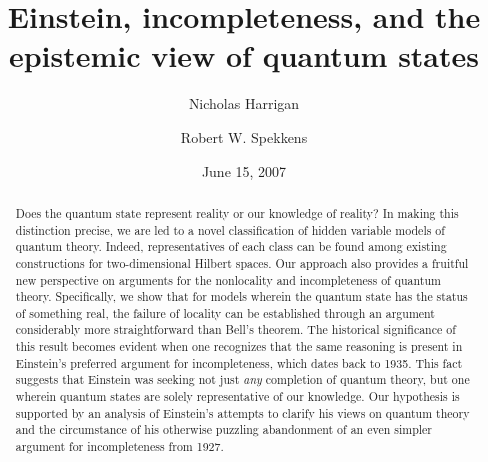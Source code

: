 \documentclass[aps,nofootinbib,12pt]{revtex4}
\begin{document}
\title{Einstein, incompleteness, and the epistemic view of quantum states}
\author{Nicholas Harrigan}
\author{Robert W. Spekkens}
\date{June 15, 2007}




\begin{abstract}
Does the quantum state represent reality or our knowledge of
reality? In making this distinction precise, we are led to a novel
classification of hidden variable models of quantum theory. Indeed,
representatives of each class can be found among existing
constructions for two-dimensional Hilbert spaces. Our approach also
provides a fruitful new perspective on arguments for the nonlocality
and incompleteness of quantum theory. Specifically, we show that for
models wherein the quantum state has the status of something real,
the failure of locality can be established through an argument
considerably more straightforward than Bell's theorem. The
historical significance of this result becomes evident when one
recognizes that the same reasoning is present in Einstein's
preferred argument for incompleteness, which dates back to 1935.
This fact suggests that Einstein was seeking not just \textit{any}
completion of quantum theory, but one wherein quantum states are
solely representative of our knowledge. Our hypothesis is supported
by an analysis of Einstein's attempts to clarify his views on
quantum theory and the circumstance of his otherwise puzzling
abandonment of an even simpler argument for incompleteness from
1927.
\end{abstract}

\end{document}
